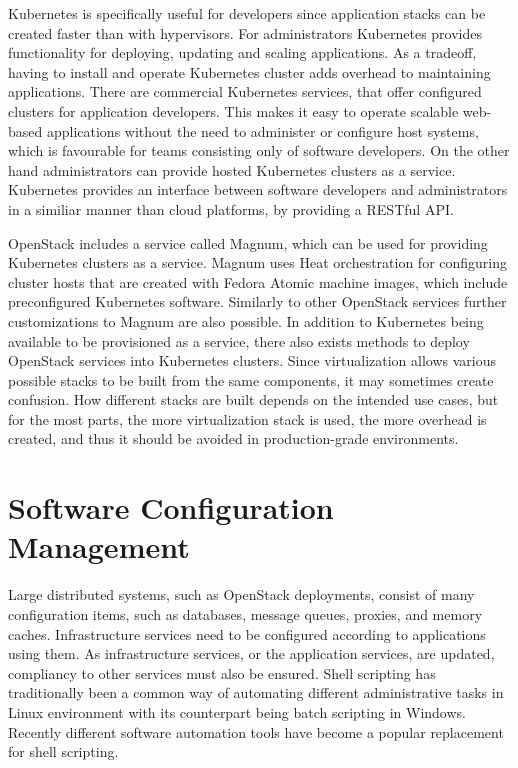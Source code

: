 Kubernetes is specifically useful for developers since application stacks can
be created faster than with hypervisors. For administrators Kubernetes provides
functionality for deploying, updating and scaling applications. As a tradeoff,
having to install and operate Kubernetes cluster adds overhead to maintaining
applications. There are commercial Kubernetes services, that offer configured
clusters for application developers. This makes it easy to operate scalable
web-based applications without the need to administer or configure host
systems, which is favourable for teams consisting only of software developers.
On the other hand administrators can provide hosted Kubernetes clusters as a
service. Kubernetes provides an interface between software developers and
administrators in a similiar manner than cloud platforms, by providing a
RESTful API.

OpenStack includes a service called Magnum, which can be used for providing
Kubernetes clusters as a service. Magnum uses Heat orchestration for
configuring cluster hosts that are created with Fedora Atomic
\cite{projectatomic} machine images, which include preconfigured Kubernetes
software. Similarly to other OpenStack services further customizations to
Magnum are also possible. In addition to Kubernetes being available to be
provisioned as a service, there also exists methods to deploy OpenStack
services into Kubernetes clusters. Since virtualization allows various possible
stacks to be built from the same components, it may sometimes create confusion.
How different stacks are built depends on the intended use cases, but for the
most parts, the more virtualization stack is used, the more overhead is
created, and thus it should be avoided in production-grade environments.

\section{Software Configuration Management} \label{software-configuration-management}

Large distributed systems, such as OpenStack deployments, consist of many
configuration items, such as databases, message queues, proxies, and memory
caches. Infrastructure services need to be configured according to applications
using them. As infrastructure services, or the application services, are
updated, compliancy to other services must also be ensured. Shell scripting has
traditionally been a common way of automating different administrative tasks in
Linux environment with its counterpart being batch scripting in Windows.
Recently different software automation tools have become a popular replacement
for shell scripting.

